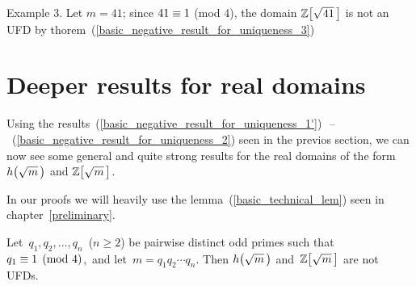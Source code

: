 \medskip
\textsf{Example 3.}  Let $m = 41$; since
$41 \equiv 1$ (mod $4$), the domain
$\ZZ{41}$ is not an UFD by
thorem~(\ref{basic_negative_result_for_uniqueness_3})

\bigskip

\section{Deeper results for real domains}

Using the
\mbox{results
(\ref{basic_negative_result_for_uniqueness_1'})%
\,--\,%
(\ref{basic_negative_result_for_uniqueness_2})}
seen in the previos section, we can now see some general
and quite strong results for the real domains of the form
$\hh{m}$ and $\ZZ{m}$.

In our proofs we will heavily use the
lemma~(\ref{basic_technical_lem})
seen in chapter~\ref{preliminary}.

\begin{thm}\label{deeper_1}
Let \,$q_1, q_2, \ldots, q_n$\, (\/$n \geq 2$\/) be pairwise distinct
odd primes such that $q_1 \equiv 1 \pmod 4$,\, and let\,
$m = q_1 q_2 \cdots q_n$.
Then $\hh{m}$ and \,$\ZZ{m}$ are not UFDs.
\end{thm}

